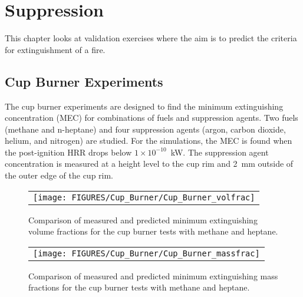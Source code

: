 
\chapter{Suppression}

This chapter looks at validation exercises where the aim is to predict the criteria for extinguishment of a fire.

\section{Cup Burner Experiments}

The cup burner experiments are designed to find the minimum extinguishing concentration (MEC) for combinations of fuels and suppression agents. Two fuels (methane and n-heptane) and four suppression agents (argon, carbon dioxide, helium, and nitrogen) are studied. For the simulations, the MEC is found when the post-ignition HRR drops below $1 \times 10^{-10}$~kW. The suppression agent concentration is measured at a height level to the cup rim and 2~mm outside of the outer edge of the cup rim.

\newpage

\begin{figure}[h!]
\begin{center}
\begin{tabular}{c}
\texttt{[image: FIGURES/Cup\_Burner/Cup\_Burner\_volfrac]}
\end{tabular}
\end{center}
\label{cup_burner_extinguish_vol}
\caption[Comparison of measured and predicted minimum extinguishing concentrations for the cup burner tests with methane and heptane]{Comparison of measured and predicted minimum extinguishing volume fractions for the cup burner tests with methane and heptane.}
\end{figure}


\begin{figure}[h!]
\begin{center}
\begin{tabular}{c}
\texttt{[image: FIGURES/Cup\_Burner/Cup\_Burner\_massfrac]}
\end{tabular}
\end{center}
\label{cup_burner_extinguish_mass}
\caption[Comparison of measured and predicted minimum extinguishing concentrations for the cup burner tests with methane and heptane]{Comparison of measured and predicted minimum extinguishing mass fractions for the cup burner tests with methane and heptane.}
\end{figure}

